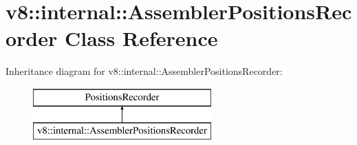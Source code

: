 \hypertarget{classv8_1_1internal_1_1_assembler_positions_recorder}{}\section{v8\+:\+:internal\+:\+:Assembler\+Positions\+Recorder Class Reference}
\label{classv8_1_1internal_1_1_assembler_positions_recorder}
Inheritance diagram for v8\+:\+:internal\+:\+:Assembler\+Positions\+Recorder\+:\begin{figure}[H]
\begin{center}
\leavevmode
\includegraphics[height=2.000000cm]{classv8_1_1internal_1_1_assembler_positions_recorder}
\end{center}
\end{figure}
